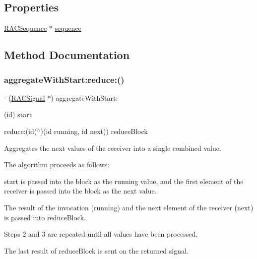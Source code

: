 \subsection*{Properties}
\begin{DoxyCompactItemize}
\item 
\mbox{\hyperlink{interface_r_a_c_sequence}{R\+A\+C\+Sequence}} $\ast$ \mbox{\hyperlink{category_r_a_c_signal_07_operations_08_ae580a10328d7f204c456068a2bfb5e1b}{sequence}}
\end{DoxyCompactItemize}


\subsection{Method Documentation}
\mbox{\label{category_r_a_c_signal_07_operations_08_a4b872b6c2322aa37f98282043e768582}} 
\subsubsection{\texorpdfstring{aggregate\+With\+Start\+:reduce\+:()}{aggregateWithStart:reduce:()}\hspace{0.1cm}{\footnotesize\ttfamily [1/3]}}
{\footnotesize\ttfamily -\/ (\mbox{\hyperlink{interface_r_a_c_signal}{R\+A\+C\+Signal}} $\ast$) aggregate\+With\+Start\+: \begin{DoxyParamCaption}\item[{(id)}]{start }\item[{reduce:(id($^\wedge$)(id running, id next))}]{reduce\+Block }\end{DoxyParamCaption}}

Aggregates the {\ttfamily next} values of the receiver into a single combined value.

The algorithm proceeds as follows\+:


\begin{DoxyEnumerate}
\item {\ttfamily start} is passed into the block as the {\ttfamily running} value, and the first element of the receiver is passed into the block as the {\ttfamily next} value.
\item The result of the invocation ({\ttfamily running}) and the next element of the receiver ({\ttfamily next}) is passed into {\ttfamily reduce\+Block}.
\item Steps 2 and 3 are repeated until all values have been processed.
\item The last result of {\ttfamily reduce\+Block} is sent on the returned signal.
\end{DoxyEnumerate}

